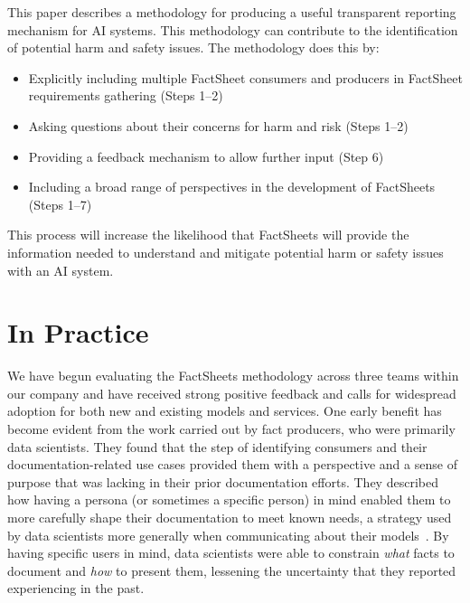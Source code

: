 \documentclass[11pt,dvipdfm]{article}
\begin{document}
This paper describes a methodology for producing a useful transparent reporting mechanism for AI systems.  This methodology can contribute to the identification of potential harm and safety issues. The methodology does this by:
\\
\begin{itemize}[noitemsep,nolistsep]
\item Explicitly including multiple FactSheet consumers and producers in FactSheet requirements gathering (Steps 1--2) 
\item Asking questions about their concerns for harm and risk (Steps 1--2) 
\item Providing a feedback mechanism to allow further input (Step 6)
\item Including a broad range of perspectives in the development of FactSheets (Steps 1--7)
\end{itemize}
\hspace{.2cm}


This process will increase the likelihood that FactSheets will provide the information needed to understand and mitigate potential harm or safety issues with an AI system.
  
\section{In Practice}
\label{sec-practice}
We have begun evaluating the FactSheets methodology across three teams within our company and have received strong positive feedback and calls for widespread adoption for both new and existing models and services. One early benefit has become evident from the work carried out by fact producers, who were primarily data scientists. They found that the step of identifying consumers and their documentation-related use cases provided them with a perspective and a sense of purpose that was lacking in their prior documentation efforts. They described how having a persona (or sometimes a specific person) in mind enabled them to more carefully shape their documentation to meet known needs, a strategy used by data scientists more generally when communicating about their models~\cite{piorkowski2021ai}. By having specific users in mind, data scientists were able to constrain \textit{what} facts to document and \textit{how} to present them, lessening the uncertainty that they reported experiencing in the past.
\end{document}
